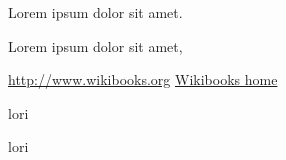\documentclass{article}
\begin{document}
Lorem ipsum dolor sit amet.


Lorem ipsum dolor sit amet,

\url{http://www.wikibooks.org}
\href{http://www.wikibooks.org}{Wikibooks home}


lori

lori
\end{document}
